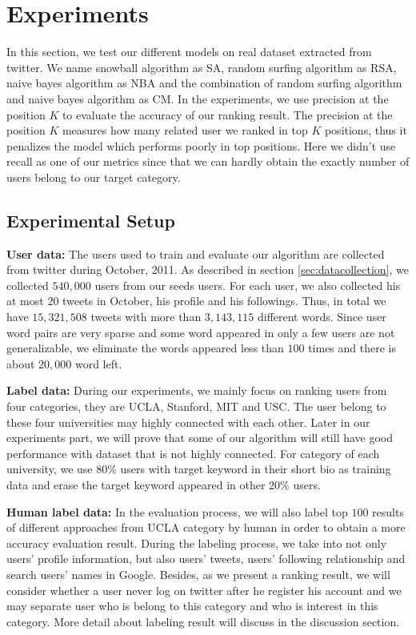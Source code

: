 \documentclass{article}
\begin{document}
\section{Experiments}\label{sec:experiment}
In this section, we test our different models on real dataset extracted from twitter. We name snowball algorithm as SA, random surfing algorithm as RSA, naive bayes algorithm as NBA and the combination of random surfing algorithm and naive bayes algorithm as CM. In the experiments, we use precision at the position $K$ to evaluate the accuracy of our ranking result. The precision at the position $K$ measures how many related user we ranked in top $K$ positions, thus it penalizes the model which performs poorly in top positions. Here we didn't use recall as one of our metrics since that we can hardly obtain the exactly number of users belong to our target category.

\subsection{Experimental Setup}
\textbf{User data:} The users used to train and evaluate our algorithm are collected from twitter during October, 2011. As described in section \ref{sec:datacollection}, we collected $540,000$ users from our seeds users. For each user, we also collected his at most $20$ tweets in October, his profile and his followings. Thus, in total we have $15,321,508$ tweets with more than $3,143,115$ different words. Since user word pairs are very sparse and some word appeared in only a few users are not generalizable, we eliminate the words appeared less than $100$ times and there is about $20,000$ word left.

\textbf{Label data:} During our experiments, we mainly focus on ranking users from four categories, they are UCLA, Stanford, MIT and USC. The user belong to these four universities may highly connected with each other. Later in our experiments part, we will prove that some of our algorithm will still have good performance with dataset that is not highly connected. For category of each university, we use $80\%$ users with target keyword in their short bio as training data and erase the target keyword appeared in other $20\%$ users.

\textbf{Human label data:} In the evaluation process, we will also label top $100$ results of different approaches from UCLA category by human in order to obtain a more accuracy evaluation result. During the labeling process, we take into not only users' profile information, but also users' tweets, users' following relationship and search users' names in Google. Besides, as we present a ranking result, we will consider whether a user never log on twitter after he register his account and we may separate user who is belong to this category and who is interest in this category. More detail about labeling result will discuss in the discussion section.
\end{document}
